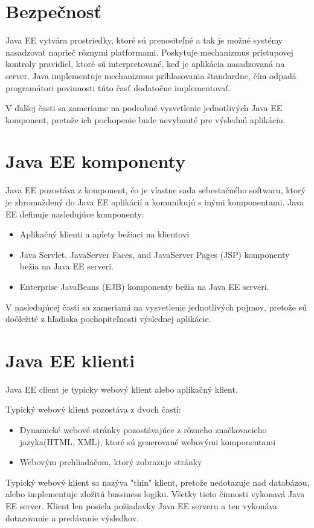 \section{Bezpečnosť}

Java EE  vytvára prostriedky, ktoré sú prenositeľné a tak je možné systémy nasadzovať naprieč rôznymi platformami. Poskytuje mechanizmus  prístupovej kontroly pravidiel, ktoré sú interpretované, keď je aplikácia nasadzovaná na server. Java implementuje mechanizmus prihlasovania štandardne, čím odpadá programátori povinnosti túto časť dodatočne implementovať.

V ďalšej časti sa zameriame na podrobné vysvetlenie jednotlivých Java EE komponent, pretože ich pochopenie bude nevyhnuté pre výslednú aplikáciu.


\section{Java EE komponenty}
Java EE pozostáva z komponent, čo je vlastne sada sebestačného softwaru, ktorý je zhromaždený do Java EE aplikácií a komunikujú s inými komponentami. Java EE definuje nasledujúce komponenty: 
\begin{itemize}
\item Aplikačný klienti a aplety bežiaci na klientovi
\item Java Servlet, JavaServer Faces, and JavaServer Pages (JSP) komponenty bežia na Java EE serveri\cite{fitWeb}.
\item Enterprise JavaBeans (EJB) komponenty bežia na Java EE serveri\cite{fitWeb}.
\end{itemize}

V nasledujúcej časti sa zameriami na vysvetlenie jednotlivých pojmov, pretože sú doôležité z hľadiska pochopiteľnosti výslednej aplikácie.

\section{Java EE klienti}
Java EE client je typicky webový klient alebo aplikačný klient.

Typický webový klient pozostáva z dvoch častí:
\begin{itemize}
\item Dynamické webové stránky pozostávajúce z rôzneho značkovacieho jazyka(HTML, XML), ktoré sú generované webovými komponentami
\item Webovým prehliadačom, ktorý zobrazuje stránky
\end{itemize}
Typický webový klient sa nazýva "thin" klient, pretože nedotazuje nad databázou, alebo implementuje zložitú bussiness logiku. Všetky tieto činnosti vykonavá Java EE server. Klient len posiela požiadavky Java EE serveru a ten vykonáva dotazovanie a predávanie výsledkov.


